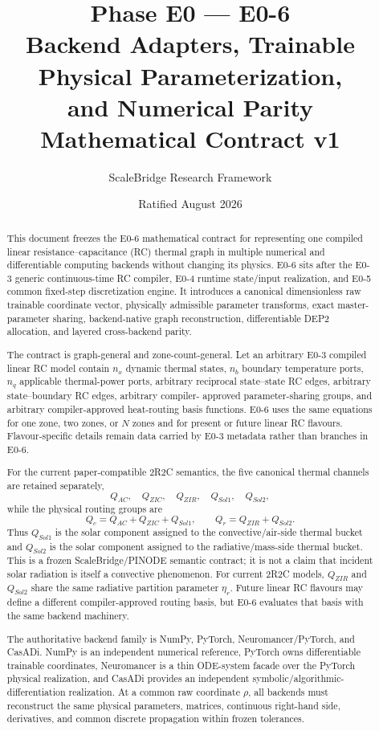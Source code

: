 \documentclass[11pt]{article}
\title{\SB{} Phase E0 --- E0-6\\
Backend Adapters, Trainable Physical Parameterization,\\
and Numerical Parity\\
Mathematical Contract v1}
\author{ScaleBridge Research Framework}
\date{Ratified August 2026}
\begin{document}
\maketitle

\begin{abstract}
This document freezes the E0-6 mathematical contract for representing one
compiled linear resistance--capacitance (RC) thermal graph in multiple numerical
and differentiable computing backends without changing its physics. E0-6 sits
after the E0-3 generic continuous-time RC compiler, E0-4 runtime
state/input realization, and E0-5 common fixed-step discretization engine.
It introduces a canonical dimensionless raw trainable coordinate vector,
physically admissible parameter transforms, exact master-parameter sharing,
backend-native graph reconstruction, differentiable DEP2 allocation, and layered
cross-backend parity.

The contract is graph-general and zone-count-general. Let an arbitrary E0-3
compiled linear RC model contain $n_x$ dynamic thermal states, $n_b$ boundary
temperature ports, $n_q$ applicable thermal-power ports, arbitrary reciprocal
state--state RC edges, arbitrary state--boundary RC edges, arbitrary compiler-
approved parameter-sharing groups, and arbitrary compiler-approved heat-routing
basis functions. E0-6 uses the same equations for one zone, two zones, or $N$
zones and for present or future linear RC flavours. Flavour-specific details
remain data carried by E0-3 metadata rather than branches in E0-6.

For the current paper-compatible 2R2C semantics, the five canonical thermal
channels are retained separately,
\[
Q_{AC},\quad Q_{ZIC},\quad Q_{ZIR},\quad Q_{Sol1},\quad Q_{Sol2},
\]
while the physical routing groups are
\[
Q_c=Q_{AC}+Q_{ZIC}+Q_{Sol1},
\qquad
Q_r=Q_{ZIR}+Q_{Sol2}.
\]
Thus $Q_{Sol1}$ is the solar component assigned to the convective/air-side
thermal bucket and $Q_{Sol2}$ is the solar component assigned to the
radiative/mass-side thermal bucket. This is a frozen ScaleBridge/PINODE semantic
contract; it is not a claim that incident solar radiation is itself a convective
phenomenon. For current 2R2C models, $Q_{ZIR}$ and $Q_{Sol2}$ share the same
radiative partition parameter $\eta_r$. Future linear RC flavours may define a
different compiler-approved routing basis, but E0-6 evaluates that basis with the
same backend machinery.

The authoritative backend family is NumPy, PyTorch, Neuromancer/PyTorch, and
CasADi. NumPy is an independent numerical reference, PyTorch owns differentiable
trainable coordinates, Neuromancer is a thin ODE-system facade over the PyTorch
physical realization, and CasADi provides an independent symbolic/algorithmic-
differentiation realization. At a common raw coordinate $\rho$, all backends
must reconstruct the same physical parameters, matrices, continuous right-hand
side, derivatives, and common discrete propagation within frozen tolerances.
\end{abstract}
\end{document}

